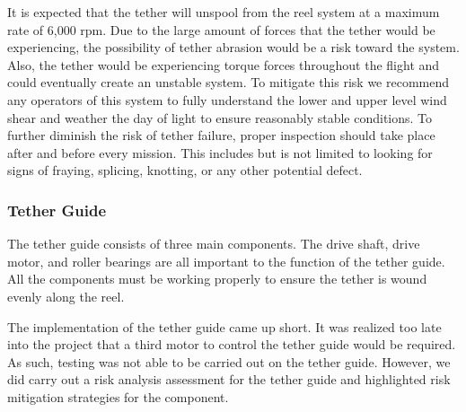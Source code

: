 \indent\indent It is expected that the tether will unspool from the reel system at a maximum rate of 6,000 rpm. Due to the large amount of forces that the tether would be experiencing, the possibility of tether abrasion would be a risk toward the system. Also, the tether would be experiencing torque forces throughout the flight and could eventually create an unstable system. To mitigate this risk we recommend any operators of this system to fully understand the lower and upper level wind shear and weather the day of light to ensure reasonably stable conditions. To further diminish the risk of tether failure, proper inspection should take place after and before every mission. This includes but is not limited to looking for signs of fraying, splicing, knotting, or any other potential defect.

\subsubsection{Tether Guide}

\indent\indent The tether guide consists of three main components. The drive shaft, drive motor, and roller bearings are all important to the function of the tether guide. All the components must be working properly to ensure the tether is wound evenly along the reel.

The implementation of the tether guide came up short. It was realized too late into the project that a third motor to control the tether guide would be required. As such, testing was not able to be carried out on the tether guide. However, we did carry out a risk analysis assessment for the tether guide and highlighted risk mitigation strategies for the component. 

